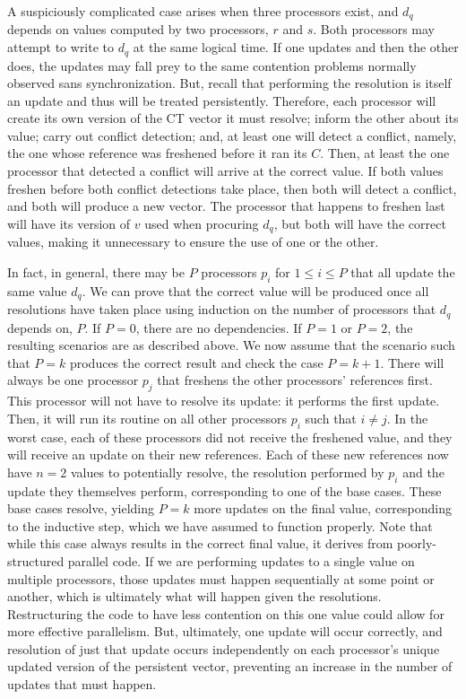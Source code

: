 A suspiciously complicated case arises when three processors exist, and $d_q$
depends on values computed by two processors, $r$ and $s$. Both processors may
attempt to write to $d_q$ at the same logical time. If one updates and then the other
does, the updates may fall prey to the same contention problems normally
observed sans synchronization. But, recall that performing the resolution is
itself an update and thus will be treated persistently. Therefore, each
processor will create its own version of the CT vector it must resolve; inform
the other about its value; carry out conflict detection; and, at least one will
detect a conflict, namely, the one whose reference was freshened before it ran
its $C$. Then, at least the one processor that detected a conflict will arrive
at the correct value. If both values freshen before both conflict detections
take place, then both will detect a conflict, and both will produce a new
vector. The processor that happens to freshen last will have its version of $v$
used when procuring $d_q$, but both will have the correct values, making it
unnecessary to ensure the use of one or the other.

In fact, in general, there may be $P$ processors $p_i$ for $1 \leq i \leq P$
that all update the same value $d_q$.  We can prove that the correct value will
be produced once all resolutions have taken place using induction on the number
of processors that $d_q$ depends on, $P$. If $P=0$, there are no dependencies.
If $P=1$ or $P=2$, the resulting scenarios are as described above. We now assume
that the scenario such that $P=k$ produces the correct result and check the case
$P=k+1$. There will always be one processor $p_j$ that freshens the other
processors' references first. This processor will not have to resolve its
update: it performs the first update. Then, it will run its routine on all
other processors $p_i$ such that $i \neq j$. In the worst case, each of these
processors did not receive the freshened value, and they will receive an update
on their new references. Each of these new references now have $n=2$ values to
potentially resolve, the resolution performed by $p_i$ and the update they
themselves perform, corresponding to one of the base cases. These base cases
resolve, yielding $P=k$ more updates on the final value, corresponding to the
inductive step, which we have assumed to function properly. Note that while this
case always results in the correct final value, it derives from
poorly-structured parallel code. If we are performing updates to a single value
on multiple processors, those updates must happen sequentially at some point or
another, which is ultimately what will happen given the resolutions.
Restructuring the code to have less contention on this one value could allow for
more effective parallelism. But, ultimately, one update will occur correctly,
and resolution of just that update occurs independently on each processor's
unique updated version of the persistent vector, preventing an increase in the
number of updates that must happen.


